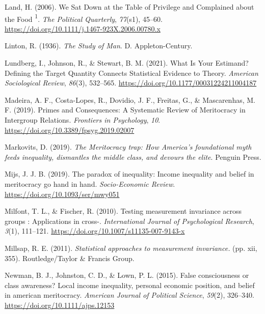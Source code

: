 \documentclass[
  10pt,
  a4paper,
]{article}
\newlength{\cslhangindent}
\newenvironment{CSLReferences}[2] %
 {\begin{list}{}{%
  \setlength{\itemindent}{0pt}
  \setlength{\leftmargin}{0pt}
  \setlength{\parsep}{0pt}
  \ifodd #1
   \setlength{\leftmargin}{\cslhangindent}
   \setlength{\itemindent}{-1\cslhangindent}
  \fi
  \setlength{\itemsep}{#2\baselineskip}}}
 {\end{list}}
\begin{document}
\begin{CSLReferences}{1}{0}
Land, H. (2006). We {Sat Down} at the {Table} of {Privilege} and {Complained} about the {Food} {\textsuperscript{1}}. \emph{The Political Quarterly}, \emph{77}(s1), 45--60. \url{https://doi.org/10.1111/j.1467-923X.2006.00780.x}

Linton, R. (1936). \emph{The {Study} of {Man}}. {D. Appleton-Century}.

Lundberg, I., Johnson, R., \& Stewart, B. M. (2021). What {Is Your Estimand}? {Defining} the {Target Quantity Connects Statistical Evidence} to {Theory}. \emph{American Sociological Review}, \emph{86}(3), 532--565. \url{https://doi.org/10.1177/00031224211004187}

Madeira, A. F., Costa-Lopes, R., Dovidio, J. F., Freitas, G., \& Mascarenhas, M. F. (2019). Primes and {Consequences}: {A Systematic Review} of {Meritocracy} in {Intergroup Relations}. \emph{Frontiers in Psychology}, \emph{10}. \url{https://doi.org/10.3389/fpsyg.2019.02007}

Markovits, D. (2019). \emph{The {Meritocracy} trap: {How America}'s foundational myth feeds inequality, dismantles the middle class, and devours the elite}. {Penguin Press}.

Mijs, J. J. B. (2019). The paradox of inequality: {Income} inequality and belief in meritocracy go hand in hand. \emph{Socio-Economic Review}. \url{https://doi.org/10.1093/ser/mwy051}

Milfont, T. L., \& Fischer, R. (2010). Testing measurement invariance across groups : {Applications} in cross-. \emph{International Journal of Psychological Research}, \emph{3}(1), 111--121. \url{https://doi.org/10.1007/s11135-007-9143-x}

Millsap, R. E. (2011). \emph{Statistical approaches to measurement invariance.} (pp. xii, 355). {Routledge/Taylor \& Francis Group}.

Newman, B. J., Johnston, C. D., \& Lown, P. L. (2015). False consciousness or class awareness? {Local} income inequality, personal economic position, and belief in american meritocracy. \emph{American Journal of Political Science}, \emph{59}(2), 326--340. \url{https://doi.org/10.1111/ajps.12153}


\end{CSLReferences}
\end{document}
